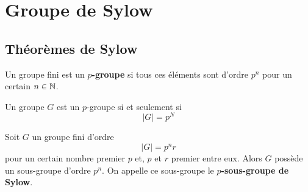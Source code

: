 \chapter{Groupe de Sylow}

\section{Théorèmes de Sylow}
\begin{definition}
	Un groupe fini est un \textbf{$p$-groupe} si tous ces éléments sont d'ordre $p^n$ pour un certain $n \in \mathbb{N}$.
\end{definition}

\begin{theoreme}
	Un groupe $G$ est un $p$-groupe si et seulement si 
	\[
	|G| = p^N
	\]
\end{theoreme}


\begin{theoreme}
	Soit $G$ un groupe fini	d'ordre
	\[
	|G| = p^n r
	\]
	pour un certain nombre premier $p$ et, $p$ et $r$ premier entre eux. Alors $G$ possède un sous-groupe d'ordre $p^n$. On appelle ce sous-groupe le \textbf{$p$-sous-groupe de Sylow}.
\end{theoreme}

